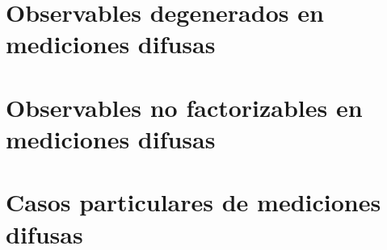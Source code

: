 \begin{comment}
$(\Leftarrow)$ Suponiendo que se cumple que \[ \left\langle\lambda_j\left|\permut{l}{\prodtensor A_i}\right|\lambda_k\right\rangle=0, \forall j\neq k, \forall \Pi_l \in \mathcal{S},\] se puede  escribir a la permutación $l$ como una combinación lineal de los operadores de proyección\[\permut{l}{\prodtensor A_i}=\sum_{\lambda_k \in \Lambda}d_{lk}P_{k}.\]Entonces en el valor esperado ({\ref{eq:valor-esperado-2instrumentnp}})
 \[\begin{split}\left \la \prodtensor A_i \right \ra_{\mathcal{I}_2}&=\sum_{\lambda_j\in \Lambda} \tr\left(\sum_{l}p_l{\sum_{\lambda_k \in \Lambda}d_{lk}P_{\lambda_k}}P_{\lambda_j}\right) \tr\left(P_{\lambda_j}\rho\right)\\ &=\sum_{\lambda_j\in \Lambda} \sum_{l}p_l d_{lj}\tr\left(P_{\lambda_j}\right)\\ &=\sum_{l}p_l \tr\left( \sum_{\lambda_j\in \Lambda} d_{lj}P_{\lambda_j}\rho\right)\\ &=\sum_{l}p_l\tr\left(\permut{l}{\prodtensor A_i}\rho\right)\\ 
    &=\tr\left(\fuzzy{\prodtensor A_i}\rho\right)=\left \la \prodtensor A_i \right \ra_{\mathcal{I}_1}
\end{split}\]

\end{proof}

\end{comment}




\section{Observables degenerados en mediciones difusas}


\section{Observables no factorizables en mediciones difusas}


\section{Casos particulares de mediciones difusas}



